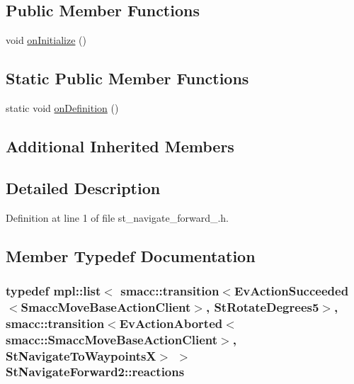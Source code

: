 \subsection*{Public Member Functions}
\begin{DoxyCompactItemize}
\item 
void \hyperlink{structStNavigateForward2_ac08065dc561a98ca39edaed1982aa986}{on\+Initialize} ()
\end{DoxyCompactItemize}
\subsection*{Static Public Member Functions}
\begin{DoxyCompactItemize}
\item 
static void \hyperlink{structStNavigateForward2_a4597cb073668e5defd0fc55dd1129c6f}{on\+Definition} ()
\end{DoxyCompactItemize}
\subsection*{Additional Inherited Members}


\subsection{Detailed Description}


Definition at line 1 of file st\+\_\+navigate\+\_\+forward\+\_.\+h.



\subsection{Member Typedef Documentation}
\subsubsection[{\texorpdfstring{reactions}{reactions}}]{\setlength{\rightskip}{0pt plus 5cm}typedef mpl\+::list$<$ {\bf smacc\+::transition}$<$Ev\+Action\+Succeeded$<$Smacc\+Move\+Base\+Action\+Client$>$, {\bf St\+Rotate\+Degrees5}$>$, {\bf smacc\+::transition}$<$Ev\+Action\+Aborted$<${\bf smacc\+::\+Smacc\+Move\+Base\+Action\+Client}$>$, {\bf St\+Navigate\+To\+WaypointsX}$>$ $>$ {\bf St\+Navigate\+Forward2\+::reactions}}\hypertarget{structStNavigateForward2_a409378565b2401a00842f1986b51b160}{}\label{structStNavigateForward2_a409378565b2401a00842f1986b51b160}


